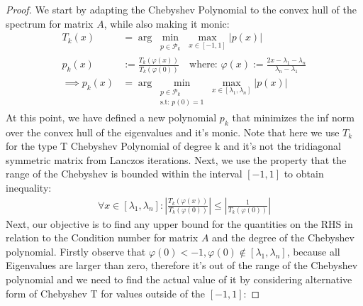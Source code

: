 \documentclass[]{article}
\theoremstyle{definition}
\begin{document}
            \begin{proof}
                We start by adapting the Chebyshev Polynomial to the convex hull of the spectrum for matrix $A$, while also making it monic: 
                \begin{align}
                    T_k(x) &= \arg\min_{
                        \substack{
                            p\in \mathcal{P}_{k}
                            }
                        }\max_{x\in [-1, 1]}|p(x)|
                    \\
                    p_k(x) &:= 
                    \frac{T_k(\varphi(x))}{T_k(\varphi(0))}
                    \quad 
                    \text{where: } 
                    \varphi(x) := \frac{2x - \lambda_1 - \lambda_n}{\lambda_n - \lambda_1}
                    \\
                    \implies p_k(x) &= \arg \min_{
                        \substack{
                            p\in \mathcal{P}_{k}
                            \\
                            \text{s.t: } p(0)  = 1
                        }
                    }\max_{x\in [\lambda_1, \lambda_n]}|p(x)|
                \end{align}
                At this point, we have defined a new polynomial $p_k$ that minimizes the inf norm over the convex hull of the eigenvalues and it's monic. Note that here we use $T_k$ for the type T Chebyshev Polynomial of degree k and it's not the tridiagonal symmetric matrix from Lanczos iterations. Next, we use the property that the range of the Chebyshev is bounded within the interval $[-1, 1]$ to obtain inequality: 
                \begin{align}
                    \forall x \in [\lambda_1, \lambda_n]: \left|
                    \frac{T_k(\varphi(x))}{T_k(\varphi(0))}
                    \right|
                    \le 
                    \left|
                        \frac{1}{T_k(\varphi(0))}
                    \right|
                \end{align}
                Next, our objective is to find any upper bound for the quantities on the RHS in relation to the Condition number for matrix $A$ and the degree of the Chebyshev polynomial. Firstly observe that $\varphi(0) < -1, \varphi(0) \not\in [\lambda_1, \lambda_n]$, because all Eigenvalues are larger than zero, therefore it's out of the range of the Chebyshev polynomial and we need to find the actual value of it by considering alternative form of Chebyshev T for values outside of the $[-1,1]$: 

\end{proof}
\end{document}
